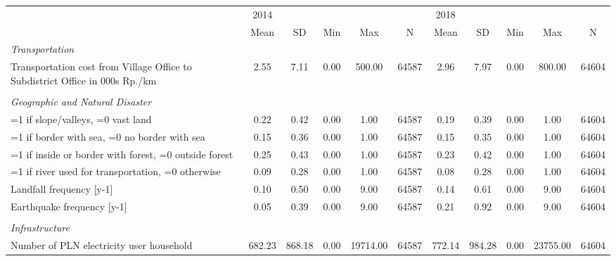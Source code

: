 \begin{tabular}{l*{2}{ccccc}}
\toprule
                &     2014&         &         &         &         &     2018&         &         &         &         \\
                &     Mean&       SD&      Min&      Max&        N&     Mean&       SD&      Min&      Max&        N\\
\midrule
\emph{Transportation}&         &         &         &         &         &         &         &         &         &         \\
Transportation cost from Village Office to Subdistrict Office in 000s Rp./km&     2.55&     7.11&     0.00&   500.00&    64587&     2.96&     7.97&     0.00&   800.00&    64604\\
\vspace{0.1em} \\ \emph{Geographic and Natural Disaster}&         &         &         &         &         &         &         &         &         &         \\
=1 if slope/valleys, =0 vast land&     0.22&     0.42&     0.00&     1.00&    64587&     0.19&     0.39&     0.00&     1.00&    64604\\
=1 if border with sea, =0 no border with sea&     0.15&     0.36&     0.00&     1.00&    64587&     0.15&     0.35&     0.00&     1.00&    64604\\
=1 if inside or border with forest, =0 outside forest&     0.25&     0.43&     0.00&     1.00&    64587&     0.23&     0.42&     0.00&     1.00&    64604\\
=1 if river used for transportation, =0 otherwise&     0.09&     0.28&     0.00&     1.00&    64587&     0.08&     0.28&     0.00&     1.00&    64604\\
Landfall frequency [y-1]&     0.10&     0.50&     0.00&     9.00&    64587&     0.14&     0.61&     0.00&     9.00&    64604\\
Earthquake frequency [y-1]&     0.05&     0.39&     0.00&     9.00&    64587&     0.21&     0.92&     0.00&     9.00&    64604\\
\vspace{0.1em} \\ \emph{Infrastructure}&         &         &         &         &         &         &         &         &         &         \\
Number of PLN electricity user household&   682.23&   868.18&     0.00& 19714.00&    64587&   772.14&   984.28&     0.00& 23755.00&    64604\\

\end{tabular}
